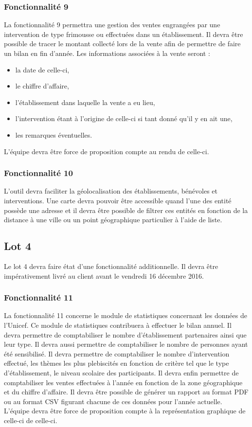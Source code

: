\subsubsection{Fonctionnalité 9}
La fonctionnalité 9 permettra une gestion des ventes engrangées par une intervention de type frimousse ou effectuées dans un établissement. 
Il devra être possible de tracer le montant collecté lors de la vente afin de permettre de faire un bilan en fin d'année.
Les informations associées à la vente seront :
\begin{itemize}
\item la date de celle-ci,
\item le chiffre d'affaire,
\item l'établissement dans laquelle la vente a eu lieu,
\item l'intervention étant à l'origine de celle-ci si tant donné qu'il y en ait une,
\item les remarques éventuelles.
\end{itemize}
L'équipe \PIC{} devra être force de proposition compte au rendu de celle-ci.

\subsubsection{Fonctionnalité 10}
L'outil devra faciliter la géolocalisation des établissements, bénévoles et interventions. Une carte devra pouvoir être accessible quand l'une des entité possède une adresse et il devra être possible de filtrer ces entités en fonction de la distance à une ville ou un point géographique particulier à l'aide de liste.



\subsection{Lot 4}
Le lot 4 devra faire état d'une fonctionnalité additionnelle. Il devra être impérativement livré au client avant le vendredi 16 décembre 2016. 

\subsubsection{Fonctionnalité 11}
La fonctionnalité 11 concerne le module de statistiques concernant les données de l'Unicef. Ce module de statistiques contribuera à effectuer le bilan annuel. 
Il devra permettre de comptabiliser le nombre d'établissement partenaires ainsi que leur type. Il devra aussi permettre de comptabiliser le nombre de personnes ayant été sensibilisé.
Il devra permettre de comptabiliser le nombre d'intervention effectué, les thèmes les plus plebiscités en fonction de critère tel que le type d'établissement, le niveau scolaire des participants.
Il devra enfin permettre de comptabiliser les ventes effectuées à l'année en fonction de la zone géographique et du chiffre d'affaire.
Il devra être possible de générer un rapport au format PDF ou au format CSV figurant chacune de ces données pour l'année actuelle.
L'équipe \PIC{} devra être force de proposition compte à la représentation graphique de celle-ci de celle-ci.

